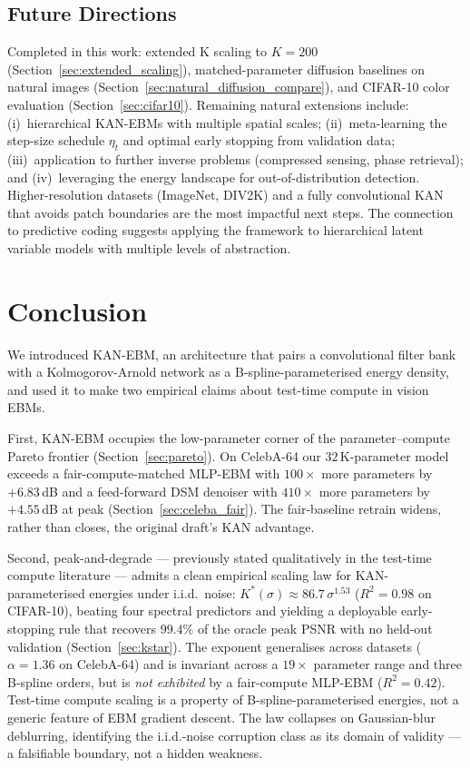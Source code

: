 \documentclass{article}
\begin{document}
\subsection{Future Directions}
Completed in this work: extended K scaling to $K{=}200$
(Section~\ref{sec:extended_scaling}), matched-parameter diffusion baselines on
natural images (Section~\ref{sec:natural_diffusion_compare}), and CIFAR-10 color
evaluation (Section~\ref{sec:cifar10}). Remaining natural extensions include:
(i)~hierarchical KAN-EBMs with multiple spatial scales; (ii)~meta-learning the
step-size schedule $\eta_t$ and optimal early stopping from validation data;
(iii)~application to further inverse problems (compressed sensing, phase retrieval);
and (iv)~leveraging the energy landscape for out-of-distribution detection.
Higher-resolution datasets (ImageNet, DIV2K) and a fully convolutional KAN
that avoids patch boundaries are the most impactful next steps.
The connection to predictive coding suggests applying the framework to
hierarchical latent variable models with multiple levels of abstraction.

\section{Conclusion}

We introduced KAN-EBM, an architecture that pairs a convolutional filter bank with a
Kolmogorov-Arnold network as a B-spline-parameterised energy density, and used it
to make two empirical claims about test-time compute in vision EBMs.

First, KAN-EBM occupies the low-parameter corner of the parameter--compute
Pareto frontier (Section~\ref{sec:pareto}). On CelebA-64 our $32$\,K-parameter
model exceeds a fair-compute-matched MLP-EBM with $100\times$ more parameters
by $+6.83$\,dB and a feed-forward DSM denoiser with $410\times$ more parameters
by $+4.55$\,dB at peak (Section~\ref{sec:celeba_fair}). The fair-baseline
retrain widens, rather than closes, the original draft's KAN advantage.

Second, peak-and-degrade --- previously stated qualitatively in the test-time
compute literature --- admits a clean empirical scaling law for
KAN-parameterised energies under i.i.d.\ noise:
$K^{*}(\sigma) \approx 86.7\,\sigma^{1.53}$ ($R^{2}{=}0.98$ on CIFAR-10),
beating four spectral predictors and yielding a deployable early-stopping rule
that recovers $99.4\%$ of the oracle peak PSNR with no held-out validation
(Section~\ref{sec:kstar}). The exponent generalises across datasets
($\alpha{=}1.36$ on CelebA-64) and is invariant across a $19\times$ parameter
range and three B-spline orders, but is \emph{not exhibited} by a
fair-compute MLP-EBM ($R^{2}{=}0.42$). Test-time compute scaling is a
property of B-spline-parameterised energies, not a generic feature of EBM
gradient descent. The law collapses on Gaussian-blur deblurring, identifying
the i.i.d.-noise corruption class as its domain of validity --- a falsifiable
boundary, not a hidden weakness.
\end{document}
